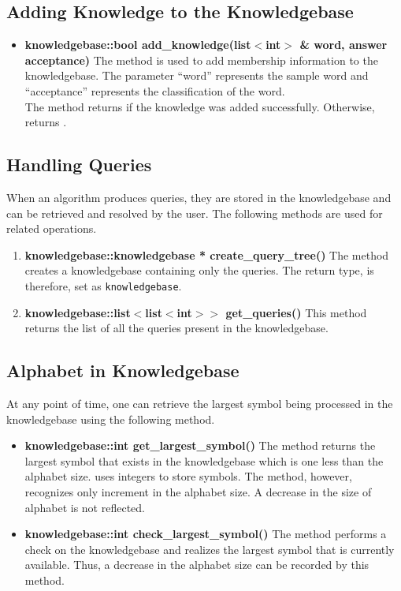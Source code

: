 \subsection*{Adding Knowledge to the Knowledgebase} 
\begin{itemize}
\item \textbf{knowledgebase::bool add\_knowledge(list$<$int$>$ \& word, answer acceptance)} \vskip 1pt
The method is used to add membership information to the knowledgebase. The parameter ``word'' represents the sample word and ``acceptance'' represents the classification of the word. \\
The method returns \true if the knowledge was added successfully. Otherwise, returns \false.
\end{itemize}	

\subsection*{Handling Queries}
When an \online algorithm produces queries, they are stored in the knowledgebase and can be retrieved and resolved by the user. The following methods are used for related operations.

\begin{enumerate}
\item \textbf{knowledgebase::knowledgebase * create\_query\_tree()} \vskip 1pt
The method creates a knowledgebase containing only the queries. The return type, is therefore, set as \texttt{knowledgebase}.
	
\item \textbf{knowledgebase::list$<$list$<$int$>$$>$ get\_queries()} \vskip 1pt
This method returns the list of all the queries present in the knowledgebase.
\end{enumerate}

\subsection*{Alphabet in Knowledgebase}
At any point of time, one can retrieve the largest symbol being processed in the knowledgebase using the following method.

\begin{itemize}
\item \textbf{knowledgebase::int get\_largest\_symbol()} \vskip 1pt 
The method returns the largest symbol that exists in the knowledgebase which is one less than the alphabet size. \libalf uses integers to store symbols. The method, however, recognizes only increment in the alphabet size. A decrease in the size of alphabet is not reflected. 

\item \textbf{knowledgebase::int check\_largest\_symbol()} \hfill \vskip 1pt
The method performs a check on the knowledgebase and realizes the largest symbol that is currently available. Thus, a decrease in the alphabet size can be recorded by this method.
\end{itemize}	


